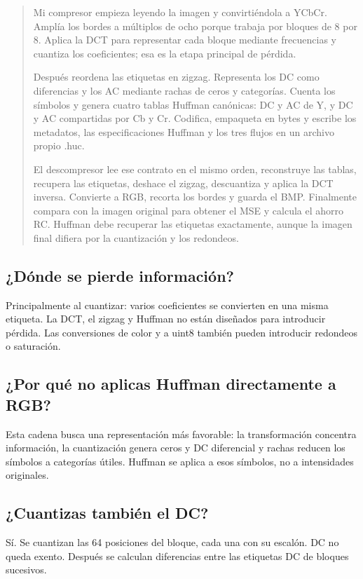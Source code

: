 \documentclass[11pt,a4paper,oneside]{report}
\begin{document}
\begin{quote}
Mi compresor empieza leyendo la imagen y convirtiéndola a YCbCr. Amplía los
bordes a múltiplos de ocho porque trabaja por bloques de 8 por 8. Aplica la DCT
para representar cada bloque mediante frecuencias y cuantiza los coeficientes;
esa es la etapa principal de pérdida.

Después reordena las etiquetas en zigzag. Representa los DC como diferencias
y los AC mediante rachas de ceros y categorías. Cuenta los símbolos y genera
cuatro tablas Huffman canónicas: DC y AC de Y, y DC y AC compartidas por Cb y Cr.
Codifica, empaqueta en bytes y escribe los metadatos, las especificaciones
Huffman y los tres flujos en un archivo propio .huc.

El descompresor lee ese contrato en el mismo orden, reconstruye las tablas,
recupera las etiquetas, deshace el zigzag, descuantiza y aplica la DCT inversa.
Convierte a RGB, recorta los bordes y guarda el BMP. Finalmente compara con
la imagen original para obtener el MSE y calcula el ahorro RC. Huffman debe
recuperar las etiquetas exactamente, aunque la imagen final difiera por la
cuantización y los redondeos.
\end{quote}


\subsection{¿Dónde se pierde información?}
Principalmente al cuantizar: varios coeficientes se convierten en una misma etiqueta. La DCT, el zigzag y Huffman no están diseñados para introducir pérdida. Las conversiones de color y a uint8 también pueden introducir redondeos o saturación.

\subsection{¿Por qué no aplicas Huffman directamente a RGB?}
Esta cadena busca una representación más favorable: la transformación concentra información, la cuantización genera ceros y DC diferencial y rachas reducen los símbolos a categorías útiles. Huffman se aplica a esos símbolos, no a intensidades originales.

\subsection{¿Cuantizas también el DC?}
Sí. Se cuantizan las 64 posiciones del bloque, cada una con su escalón. DC no queda exento. Después se calculan diferencias entre las etiquetas DC de bloques sucesivos.
\end{document}

